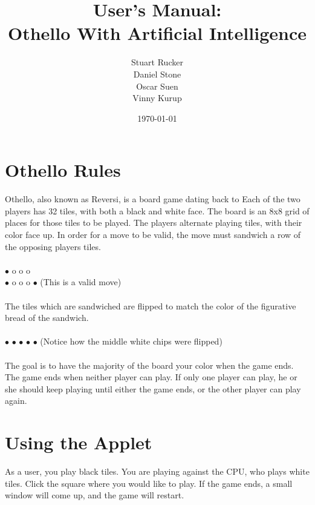 \documentclass[12pt]{article}
\title{User's Manual: \\ Othello With Artificial Intelligence}
\author{Stuart Rucker \\ Daniel Stone \\ Oscar Suen\\ Vinny Kurup}
\date{\today}
\begin{document}
\maketitle

\section{Othello Rules}
Othello, also known as Reversi, is a board game dating back to  Each of the two players has 32 tiles, with both a black and white face. The board is an 8x8 grid of places for those tiles to be played. The players alternate playing tiles, with their color face up. In order for a move to be valid, the move must sandwich a row of the opposing players tiles.\\\\
$\bullet$ o o o\\
$\bullet$ o o o $\bullet$ (This is a valid move)\\\\
The tiles which are sandwiched are flipped to match the color of the figurative bread of the sandwich.\\\\
$\bullet$ $\bullet$ $\bullet$ $\bullet$ $\bullet$ (Notice how the middle white chips were flipped)\\\\
 The goal is to have the majority of the board your color when the game ends. The game ends when neither player can play. If only one player can play, he or she should keep playing until either the game ends, or the other player can play again. 
\section{Using the Applet}
As a user, you play black tiles. You are playing against the CPU, who plays white tiles. Click the square where you would like to play. If the game ends, a small window will come up, and the game will restart.
\end{document}
